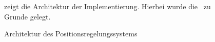 



\begin{figure}[ht!]
\vspace{0.25cm}
\begin{center}
\caption{Architektur des Positionsregelungssystems}
\label{fig:CArch}
\end{center}

\vspace{0.25cm}
 zeigt die Architektur der Implementierung. Hierbei wurde die \clean\ zu Grunde gelegt.
\end{figure}









